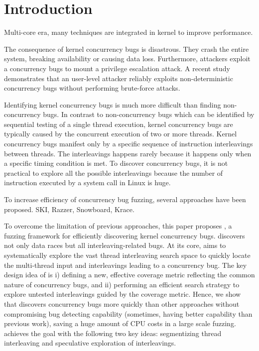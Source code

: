 \section{Introduction}
\label{s:intro}


Multi-core era, many techniques are integrated in kernel to improve performance. 

The consequence of kernel concurrency bugs is disastrous. They crash
the entire system, breaking availability or causing data loss. 
Furthermore, attackers 
exploit a concurrency bugs to mount a privilege escalation attack.
A recent study~\cite{exprace} demonstrates that an user-level attacker 
reliably exploits non-deterministic concurrency bugs without performing
brute-force attacks.

Identifying kernel concurrency bugs is much more difficult than 
finding non-concurrency bugs. 
In contrast to non-concurrency bugs which can be identified by 
sequential testing of a single thread execution,
kernel concurrency bugs are typically caused by the concurrent execution 
of two or more threads.
Kernel concurrency bugs manifest only by a specific sequence of
instruction interleavings between threads. The interleavings happens 
rarely because it happens only when a specific timing condition is met.
To discover concurrency bugs, it is not practical to explore all
the possible interleavings because the number of instruction
executed by a system call in Linux is huge.

To increase efficiency of concurrency bug fuzzing, several approaches
have been proposed. SKI, Razzer, Snowboard, Krace.




To overcome the limitation of previous approaches, this paper proposes
\sys, a fuzzing framework for efficiently discovering kernel concurrency bugs. \sys discovers not only data races but all interleaving-related bugs. 
At its core, \sys aims to systematically explore the vast thread
interleaving search space to quickly locate the multi-thread input and 
interleavings leading to a concurrency bug. The key design idea of \sys 
is i) defining a new, effective coverage metric reflecting the 
common nature of concurrency bugs, and ii) performing an efficient search
strategy to explore untested interleavings guided by the coverage metric.
Hence, we show that \sys discovers concurrency bugs more quickly than 
other approaches without compromising bug detecting capability 
(sometimes, having better capability than previous work), saving a huge 
amount of CPU costs in a large scale fuzzing. \sys achieves the goal 
with the following two key ideas: segmentizing thread interleaving and speculative exploration  of interleavings.

